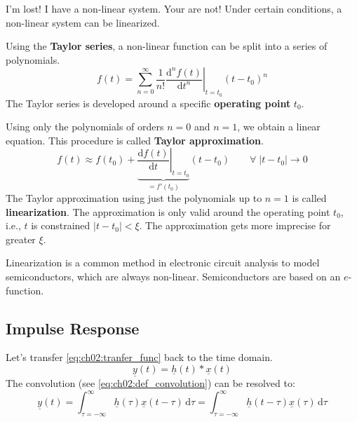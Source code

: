 \begin{refsection}
\begin{excursus}{I'm lost! I have a non-linear system.}
	Your are not! Under certain conditions, a non-linear system can be linearized.
	
	Using the  \textbf{Taylor series}, a non-linear function can be split into a series of polynomials.
	\begin{equation}
		f(t) = \sum_{n=0}^{\infty} \left. \frac{1}{n!} \frac{\mathrm{d}^n f(t)}{\mathrm{d} t^n} \right|_{t = t_0} \left(t - t_0\right)^n
	\end{equation}
	The Taylor series is developed around a specific  \textbf{operating point} $t_0$.
	
	Using only the polynomials of orders $n = 0$ and $n = 1$, we obtain a linear equation. This procedure is called  \textbf{Taylor approximation}.
	\begin{equation}
		f(t) \approx f(t_0) + \underbrace{\left. \frac{\mathrm{d} f(t)}{\mathrm{d} t} \right|_{t = t_0}}_{= f'(t_0)} \left(t - t_0\right) \qquad \forall \; |t - t_0| \rightarrow 0
	\end{equation}
	The Taylor approximation using just the polynomials up to $n = 1$ is called  \textbf{linearization}. The approximation is only valid around the operating point $t_0$, i.e., $t$ is constrained $|t - t_0| < \xi$. The approximation gets more imprecise for greater $\xi$.
	
	Linearization is a common method in electronic circuit analysis to model semiconductors, which are always non-linear. Semiconductors are based on an $e$-function.
\end{excursus}


\subsection{Impulse Response}

Let's transfer \eqref{eq:ch02:tranfer_func} back to the time domain.
\begin{equation}
	\underline{y}(t) = \underline{h}(t) * \underline{x}(t)
\end{equation}
The convolution (see \eqref{eq:ch02:def_convolution}) can be resolved to:
\begin{equation}
	\underline{y}(t) = \int_{\tau = -\infty}^{\infty} \underline{h}(\tau) \underline{x}(t - \tau) \, \mathrm{d} \tau = \int_{\tau = -\infty}^{\infty} \underline{h}(t - \tau) \underline{x}(\tau) \, \mathrm{d} \tau
\end{equation}


\end{refsection}
